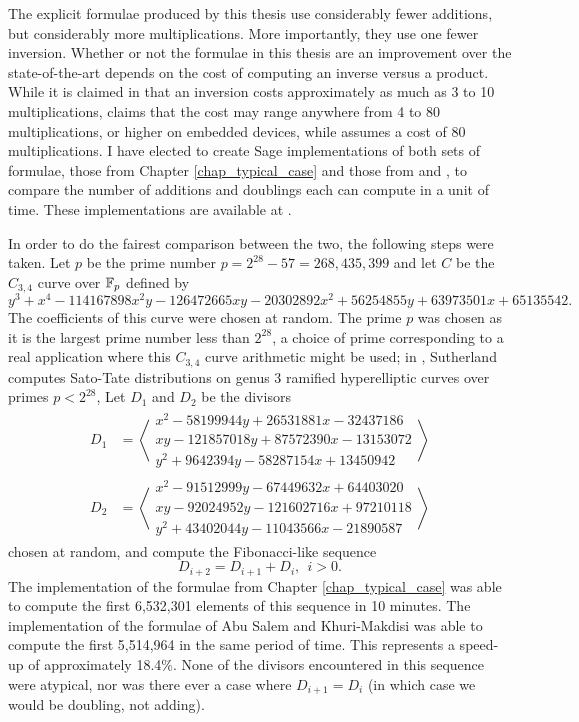 The explicit formulae produced by this thesis use considerably fewer additions, but considerably more multiplications.
More importantly, they use one fewer inversion.
Whether or not the formulae in this thesis are an improvement over the state-of-the-art depends
on the cost of computing an inverse versus a product.
While it is claimed in \cite{salem07} that an inversion costs approximately as much as 3 to 10 multiplications,
\cite{dahmen07} claims that the cost may range anywhere from 4 to 80 multiplications, or higher on embedded devices,
while \cite{hankerson04} assumes a cost of 80 multiplications.
I have elected to create Sage implementations of both sets of formulae,
those from Chapter \ref{chap_typical_case} and those from \cite{salem07} and \cite{kmakdisi18},
to compare the number of additions and doublings each can compute in a unit of time.
These implementations are available at \cite{github}.

In order to do the fairest comparison between the two, the following steps were taken.
Let $p$ be the prime number $p = 2^{28} - 57 = 268,435,399$
and let $C$ be the $C_{3,4}$ curve over $\mathbb{F}_p$ defined by
 \[y^3 + x^4 - 114167898x^2y - 126472665xy - 20302892x^2 + 56254855y + 63973501x + 65135542.\]
The coefficients of this curve were chosen at random.
The prime $p$ was chosen as it is the largest prime number less than $2^{28}$,
a choice of prime corresponding to a real application where this $C_{3,4}$ curve arithmetic might be used;
in \cite{sutherland16}, Sutherland computes Sato-Tate distributions
on genus 3 ramified hyperelliptic curves over primes $p < 2^{28}$,
Let $D_1$ and $D_2$ be the divisors
\begin{align*}
  D_1 &= \left\langle \begin{array}{r}
    x^2 -  58199944y + 26531881x - 32437186 \\
     xy - 121857018y + 87572390x - 13153072 \\
    y^2 +   9642394y - 58287154x + 13450942
  \end{array} \right\rangle \\
  D_2 &= \left\langle \begin{array}{r}
    x^2 - 91512999y -  67449632x + 64403020 \\
     xy - 92024952y - 121602716x + 97210118 \\
    y^2 + 43402044y - 11043566x  - 21890587
  \end{array} \right\rangle
\end{align*}
chosen at random, and compute the Fibonacci-like sequence 
  \[ D_{i+2} = D_{i+1} + D_i, ~~ i > 0. \]
The implementation of the formulae from Chapter \ref{chap_typical_case} was able to compute
the first 6,532,301 elements of this sequence in 10 minutes.
The implementation of the formulae of Abu Salem and Khuri-Makdisi was able to compute
the first 5,514,964 in the same period of time.
This represents a speed-up of approximately 18.4\%.
None of the divisors encountered in this sequence were atypical,
nor was there ever a case where $D_{i+1} = D_{i}$
(in which case we would be doubling, not adding).

